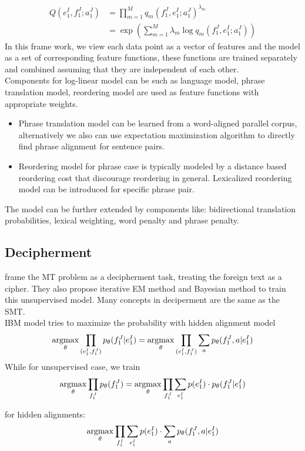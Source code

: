 \begin{align*}
	Q(e_1^I, f_1^J; a_1^J) & = \prod_{m=1}^{M} q_m(f_1^J, e_1^I; a_1^J)^{\lambda_m} \\
	& = \exp(\sum_{m=1}^{M} \lambda_m \log q_m(f_1^J, e_1^I; a_1^J))
\end{align*}
In this frame work, we view each data point as a vector of features and the model as a set of corresponding feature functions, these functions are trained separately and combined assuming that they are independent of each other.\\ 

Components for log-linear model can be such as language model, phrase translation model, reordering model are used as feature functions with appropriate weights.
\begin{itemize}
	\item Phrase translation model can be learned from a word-aligned parallel corpus, alternatively we also can use expectation maximization algorithm to directly find phrase alignment for sentence pairs.
	\item Reordering model for phrase case is typically modeled by a distance based reordering cost that discourage reordering in general. Lexicalized reordering model can be introduced for specific phrase pair.
\end{itemize}

The model can be further extended by components like: bidirectional translation probabilities, lexical weighting, word penalty and phrase penalty. 

\subsection{Decipherment}
\cite{ravi2011deciphering} frame the MT problem as a decipherment task, treating the foreign text as a cipher. They also propose iterative EM method and Bayesian method to train this unsupervised model. Many concepts in deciperment are the same as the SMT.\\

IBM model tries to maximize the probability with hidden alignment model
\[ \underset{\theta}{\operatorname{argmax}} \prod_{(e_1^I,{f}_1^J) } {p_{\theta}(f_1^J|e_1^I)} = \underset{\theta}{\operatorname{argmax}} \prod_{ (e_1^I,{f}_1^J) } \sum_{a} p_{\theta}({f}_1^J, a| e_1^I)  \]
While for unsupervised case, we train 
\[ \underset{\theta}{\operatorname{argmax}} \prod_{f_1^J}p_{\theta}(f_1^J)= \underset{\theta}{\operatorname{argmax}} \prod_{f_1^J} \sum_{e_1^I} p({e}_1^I) \cdot p_{\theta}(f_1^J|e_1^I)\]

for hidden alignments: \[ \underset{\theta}{\operatorname{argmax}} \prod_{{f}_1^I} \sum_{{e}_1^I} p({e}_1^I) \cdot \sum_{a} p_{\theta}({f}_1^J,a|{e}_1^I) \]

